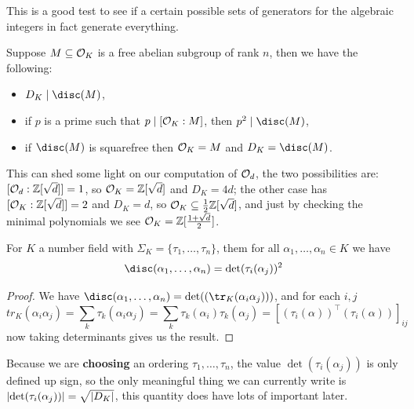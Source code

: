 \documentclass{article}
\begin{document}
This is a good test to see if a certain possible sets of generators for the algebraic integers in fact generate everything.

\begin{corollary}
    Suppose $M\subseteq \mathcal{O}_K$ is a free abelian subgroup of rank $n$, then we have the following: \begin{itemize}
        \item $D_K\mid\disc(M)$,
        \item if $p$ is a prime such that $p\mid[\mathcal{O}_K:M]$, then $p^2\mid\disc(M)$,
        \item if $\disc(M)$ is squarefree then $\mathcal{O}_K=M$ and $D_K = \disc(M)$. 
    \end{itemize}
\end{corollary}

This can shed some light on our computation of $\mathcal{O}_d$, the two possibilities are: $[\mathcal{O}_d:\mathbb{Z}[\sqrt{d}]]=1$, so $\mathcal{O}_K=\mathbb{Z}[\sqrt{d}]$ and $D_K=4d$; the other case has $[\mathcal{O}_K:\mathbb{Z}[\sqrt{d}]]=2$ and $D_K=d$, so $\mathcal{O}_K\subseteq\frac{1}{2}\mathbb{Z}[\sqrt{d}]$, and just by checking the minimal polynomials we see $\mathcal{O}_K=\mathbb{Z}[\frac{1+\sqrt{d}}{2}]$.

\begin{proposition}
    For $K$ a number field with $\Sigma_K=\{\tau_1,\ldots,\tau_n\}$, them for all $\alpha_1,\ldots,\alpha_n\in K$ we have \[
    \disc(\alpha_1,\ldots,\alpha_n) = \det(\tau_i(\alpha_j))^2
    \]\begin{proof}
        We have $\disc(\alpha_1,\ldots,\alpha_n)=\det((\tr_K(\alpha_i\alpha_j)))$, and for each $i,j$ \[
        tr_K(\alpha_i\alpha_j) = \sum_k\tau_k(\alpha_i\alpha_j) = \sum_k\tau_k(\alpha_i)\tau_k(\alpha_j) = [(\tau_i(\alpha))^\top(\tau_i(\alpha))]_{ij}
        \] now taking determinants gives us the result.
    \end{proof}
\end{proposition}

Because we are \textbf{choosing} an ordering $\tau_1,\ldots,\tau_n$, the value $\det(\tau_i(\alpha_j))$ is only defined up sign, so the only meaningful thing we can currently write is $\left| \det(\tau_i(\alpha_j)) \right|=\sqrt{\left| D_K \right|}$, this quantity does have lots of important later.
\end{document}
